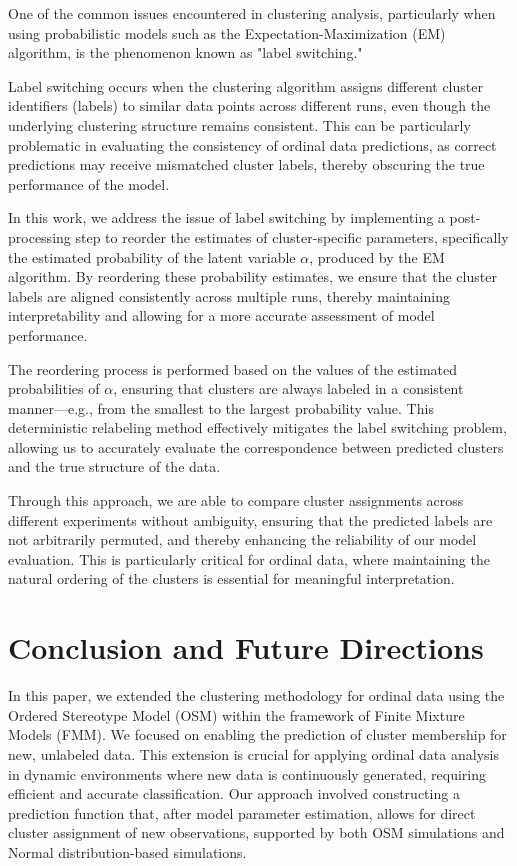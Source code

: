 \documentclass{article}
\begin{document}
One of the common issues encountered in clustering analysis, 
particularly when using probabilistic models such as the Expectation-Maximization (EM) algorithm, 
is the phenomenon known as "label switching." 

Label switching occurs when the clustering algorithm assigns different cluster identifiers (labels) to similar data points across different runs, 
even though the underlying clustering structure remains consistent. 
This can be particularly problematic in evaluating the consistency of ordinal data predictions, 
as correct predictions may receive mismatched cluster labels, 
thereby obscuring the true performance of the model.

In this work, we address the issue of label switching by implementing a post-processing step to reorder the estimates of cluster-specific parameters, 
specifically the estimated probability of the latent variable 
$\alpha$, produced by the EM algorithm. By reordering these probability estimates, 
we ensure that the cluster labels are aligned consistently across multiple runs, 
thereby maintaining interpretability and allowing for a more accurate assessment of model performance.

The reordering process is performed based on the values of the estimated probabilities of 
$\alpha$, ensuring that clusters are always labeled in a consistent manner—e.g., 
from the smallest to the largest probability value. 
This deterministic relabeling method effectively mitigates the label switching problem, 
allowing us to accurately evaluate the correspondence between predicted clusters and the true structure of the data.

Through this approach, we are able to compare cluster assignments across different experiments without ambiguity, 
ensuring that the predicted labels are not arbitrarily permuted, and thereby enhancing the reliability of our model evaluation. 
This is particularly critical for ordinal data, where maintaining the natural ordering of the clusters is essential for meaningful interpretation.

\section{Conclusion and Future Directions}

In this paper, we extended the clustering methodology for ordinal data using the Ordered Stereotype Model (OSM) within the framework of Finite Mixture Models (FMM). We focused on enabling the prediction of cluster membership for new, unlabeled data. This extension is crucial for applying ordinal data analysis in dynamic environments where new data is continuously generated, requiring efficient and accurate classification. Our approach involved constructing a prediction function that, after model parameter estimation, allows for direct cluster assignment of new observations, supported by both OSM simulations and Normal distribution-based simulations.
\end{document}
